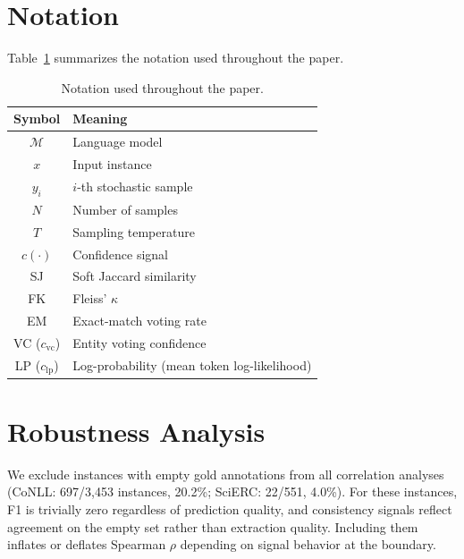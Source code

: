 \raggedbottom
\setlength{\floatsep}{2pt plus 1pt minus 1pt}
\setlength{\textfloatsep}{3pt plus 1pt minus 1pt}
\setlength{\intextsep}{2pt plus 1pt minus 1pt}
\setlength{\dblfloatsep}{2pt plus 1pt minus 1pt}
\setlength{\dbltextfloatsep}{3pt plus 1pt minus 1pt}
\setlength{\abovecaptionskip}{4pt}
\setlength{\belowcaptionskip}{-2pt}
\section{Notation}\label{app:notation}

Table~\ref{tab:notation} summarizes the notation used throughout the paper.

\begin{table}[h]
\centering
\small
\begin{tabular}{cl}
\toprule
Symbol & Meaning \\
\midrule
$\mathcal{M}$ & Language model \\
$x$ & Input instance \\
$y_i$ & $i$-th stochastic sample \\
$N$ & Number of samples \\
$T$ & Sampling temperature \\
$c(\cdot)$ & Confidence signal \\
SJ & Soft Jaccard similarity \\
FK & Fleiss' $\kappa$ \\
EM & Exact-match voting rate \\
VC ($c_{\mathrm{vc}}$) & Entity voting confidence \\
LP ($c_{\mathrm{lp}}$) & Log-probability (mean token log-likelihood) \\
\bottomrule
\end{tabular}
\caption{Notation used throughout the paper.}
\label{tab:notation}
\end{table}

\section{Robustness Analysis}\label{app:robustness}

We exclude instances with empty gold annotations from all correlation analyses (CoNLL: 697/3{,}453 instances, 20.2\%; SciERC: 22/551, 4.0\%).
For these instances, F1 is trivially zero regardless of prediction quality, and consistency signals reflect agreement on the empty set rather than extraction quality. Including them inflates or deflates Spearman $\rho$ depending on signal behavior at the boundary.

